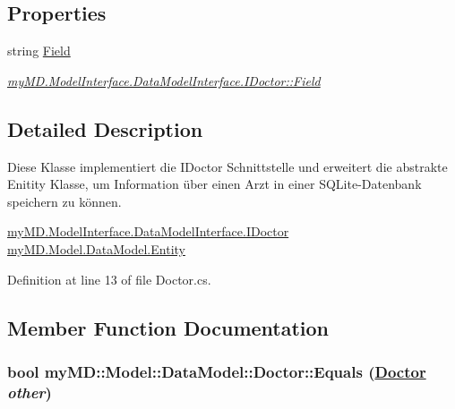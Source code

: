 \subsection*{Properties}
\begin{CompactItemize}
\item 
\hypertarget{classmy_m_d_1_1_model_1_1_data_model_1_1_doctor_6f16a5f8ff5d75ab84c018adacdfcbb7}{
string \hyperlink{classmy_m_d_1_1_model_1_1_data_model_1_1_doctor_6f16a5f8ff5d75ab84c018adacdfcbb7}{Field}}
\label{db/d24/classmy_m_d_1_1_model_1_1_data_model_1_1_doctor_6f16a5f8ff5d75ab84c018adacdfcbb7}

\begin{CompactList}\small\item\em \hyperlink{interfacemy_m_d_1_1_model_interface_1_1_data_model_interface_1_1_i_doctor_6f16a5f8ff5d75ab84c018adacdfcbb7}{my\-MD.Model\-Interface.Data\-Model\-Interface.IDoctor::Field} \item\end{CompactList}\end{CompactItemize}


\subsection{Detailed Description}
Diese Klasse implementiert die IDoctor Schnittstelle und erweitert die abstrakte Enitity Klasse, um Information \"{u}ber einen Arzt in einer SQLite-Datenbank speichern zu k\"{o}nnen. 

\hyperlink{interfacemy_m_d_1_1_model_interface_1_1_data_model_interface_1_1_i_doctor}{my\-MD.Model\-Interface.Data\-Model\-Interface.IDoctor} \hyperlink{classmy_m_d_1_1_model_1_1_data_model_1_1_entity}{my\-MD.Model.Data\-Model.Entity} 



Definition at line 13 of file Doctor.cs.

\subsection{Member Function Documentation}
\hypertarget{classmy_m_d_1_1_model_1_1_data_model_1_1_doctor_824a27e9f956ed471d294272a7428c52}{
\subsubsection[Equals]{\setlength{\rightskip}{0pt plus 5cm}bool my\-MD::Model::Data\-Model::Doctor::Equals (\hyperlink{classmy_m_d_1_1_model_1_1_data_model_1_1_doctor}{Doctor} {\em other})}}
\label{db/d24/classmy_m_d_1_1_model_1_1_data_model_1_1_doctor_824a27e9f956ed471d294272a7428c52}


